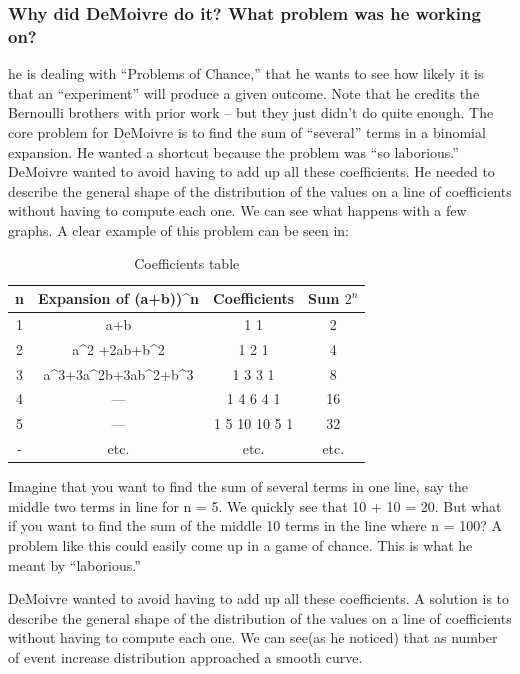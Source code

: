 \documentclass{article}
\begin{document}
\subsubsection{Why did DeMoivre do it? What problem was he working on?}
he is dealing with
“Problems of Chance,” that he wants
to see how likely it is that an
“experiment” will produce a given
outcome. Note that he credits the
Bernoulli brothers with prior work –
but they just didn’t do quite enough.
The core problem for DeMoivre is to
find the sum of “several” terms in a
binomial expansion. He wanted a
shortcut because the problem was “so
laborious.”
DeMoivre wanted to avoid having to add up all these coefficients. He needed to describe the general
shape of the distribution of the values on a line of coefficients without having to compute each one. We can see what happens with a few graphs.
A clear example of this problem can be seen in:
\begin{table}[H]
\centering
\begin{tabular}{c|c|c|c}
  n &  Expansion of (a+b))^n & Coefficients & Sum $2^{n} $ \\\hline

  1 &  a+b& 1 1 & 2                                \\
  2 & a^2 +2ab+b^2 & 1 2 1 & 4                     \\
  3 & a^3+3a^{2}b+3ab^2+b^3 & 1 3 3 1 & 8                \\
  4 & ---   & 1 4 6 4 1 & 16                         \\
  5 & ---   & 1 5 10 10 5 1 & 32                     \\
  - & etc. & etc. & etc.  &                        \\

\end{tabular}
\caption{\label{tab:widgets}Coefficients table}
\end{table}

Imagine that you want to find the sum of
several terms in one line, say the middle two
terms in line for n = 5.
We quickly see that 10 + 10 = 20.
But what if you want to find the sum of the middle
10 terms in the line where n = 100? A problem like
this could easily come up in a game of chance. This
is what he meant by “laborious.”

DeMoivre wanted to avoid having to add up all these coefficients. A solution is to describe the general shape of the distribution of the values on a line of coefficients without having to compute each one. We
can see(as he noticed) that as number of event increase distribution approached a smooth curve.
\end{document}
